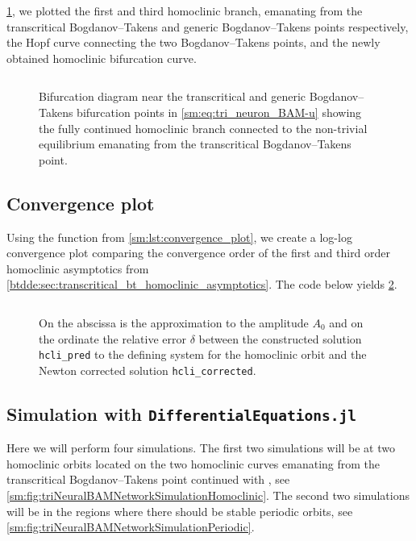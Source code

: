 \cref{sm:fig:triNeuronBAMNeuralNetworkModelConnectionHomoclinicParameters}, we plotted the first and third homoclinic branch, emanating from the
transcritical Bogdanov--Takens and generic Bogdanov--Takens points
respectively, the Hopf curve connecting the two Bogdanov--Takens points, and
the newly obtained homoclinic bifurcation curve.
\inputminted[firstline=501, lastline=529]{MATLAB}{\pathToDDEBifToolDemos/BAM_neural_network_model/BAMnn.m}
\begin{figure}[ht]
    \centering
    \caption{
    Bifurcation diagram near the transcritical and generic Bogdanov--Takens
    bifurcation points in \cref{sm:eq:tri_neuron_BAM-u} showing the fully continued
    homoclinic branch connected to the non-trivial equilibrium emanating from the
    transcritical Bogdanov--Takens point.}
    \label{sm:fig:triNeuronBAMNeuralNetworkModelConnectionHomoclinicParameters}
\end{figure}


\subsection{Convergence plot}
\label{sm:sec:tri_neuron_BAM:convergence_plot}
Using the function from \cref{sm:lst:convergence_plot}, we create a log-log
convergence plot comparing the convergence order of the first and third order
homoclinic asymptotics from \cref{btdde:sec:transcritical_bt_homoclinic_asymptotics}.
The code below yields \cref{sm:fig:triNeuralBAMNetworkModelConvergencePlot}.
\inputminted[firstline=531, lastline=542]{MATLAB}{\pathToDDEBifToolDemos/BAM_neural_network_model/BAMnn.m}
\begin{figure}[ht]
    \centering
     \caption{On the abscissa is the approximation to the amplitude $A_0$ and on
        the ordinate the relative error $\delta$ between the constructed solution
        \texttt{hcli_pred} to the defining system for the homoclinic orbit
        and the Newton corrected solution \texttt{hcli_corrected}.}
    \label{sm:fig:triNeuralBAMNetworkModelConvergencePlot}
\end{figure}

\subsection{Simulation with {\tt DifferentialEquations.jl}}
\label{sm:sec:triNeuralBAMNetworkModelSimulation}
Here we will perform four simulations. The first two simulations will be at two
homoclinic orbits located on the two homoclinic curves emanating from the
transcritical Bogdanov--Takens point continued with \DDEBIFTOOL, see
\cref{sm:fig:triNeuralBAMNetworkSimulationHomoclinic}. The second two simulations will be in
the regions where there should be stable periodic orbits, see
\cref{sm:fig:triNeuralBAMNetworkSimulationPeriodic}.

